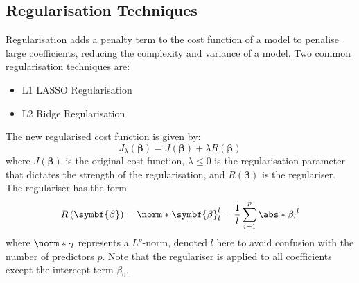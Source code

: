 \documentclass{article}
\begin{document}
\subsection{Regularisation Techniques}
Regularisation adds a penalty term to the cost function of a model to
penalise large coefficients, reducing the complexity and variance of a
model. Two common regularisation techniques are:
\begin{itemize}
    \item L1 LASSO Regularisation
    \item L2 Ridge Regularisation
\end{itemize}
The new regularised cost function is given by:
\begin{equation*}
    J_\lambda\left( \symbf{\beta} \right) = J\left( \symbf{\beta} \right) + \lambda R\left( \symbf{\beta} \right)
\end{equation*}
where \(J\left( \symbf{\beta} \right)\) is the original cost function,
\(\lambda \leqslant 0\) is the regularisation parameter that dictates the
strength of the regularisation, and \(R\left( \symbf{\beta} \right)\) is
the regulariser. The regulariser has the form
\begin{equation*}
    R\left( \symbf{\beta} \right) = \norm*{\symbf{\beta}}^l_l = \frac{1}{l} \sum_{i = 1}^p \abs*{\beta_i}^l
\end{equation*}
where \(\norm*{\cdot}_l\) represents a \(L^p\)-norm, denoted \(l\) here to
avoid confusion with the number of predictors \(p\). Note that the
regulariser is applied to all coefficients except the intercept term
\(\beta_0\).
\end{document}
